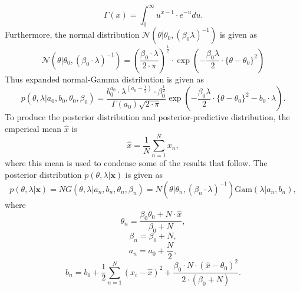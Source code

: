 \documentclass{article}
\begin{document}
\begin{equation}
\Gamma(x) = \int_{0}^{\infty} u^{x - 1} \cdot e^{-u} du.
\end{equation}
Furthermore, the normal distribution $\mathcal{N}\left( \theta \vert \theta_0, (\beta_0 \lambda)^{-1} \right)$ is given as
\begin{equation}
\mathcal{N}\left( \theta \vert \theta_0, (\beta_0 \cdot \lambda)^{-1} \right) = \left(\frac{\beta_0 \cdot \lambda}{2\cdot \pi}\right)^{\frac{1}{2}} \cdot \exp \left(  -\frac{\beta_0 \lambda}{2} \cdot \{ \theta - \theta_0 \}^2\right)
\end{equation}
Thus expanded normal-Gamma distribution is given as
\begin{equation}
p(\theta, \lambda \vert a_0, b_0, \theta_0, \beta_0) = \frac{b_0^{a_0} \cdot \lambda^{\left(a_0 - \frac{1}{2} \right)} \cdot \beta_0^{\frac{1}{2}} }{\Gamma(a_0) \sqrt{2 \cdot \pi}} \exp \left( -\frac{\beta_0 \lambda}{2} \cdot \{ \theta - \theta_0 \}^2 - b_0 \cdot \lambda \right).
\end{equation}
To produce the posterior distribution and posterior-predictive distribution, the emperical mean $\hat{x}$ is
\begin{equation}
\hat{x} = \frac{1}{N} \sum_{n=1}^{N} x_n,
\end{equation}
where this mean is used to condense some of the results that follow. The posterior distribution $p(\theta, \lambda \vert \mathbf{x})$ is given as
\begin{equation}
p(\theta, \lambda \vert \mathbf{x}) = NG(\theta, \lambda \vert a_n, b_n, \theta_n, \beta_n) = N(\theta \vert \theta_n, \left( \beta_n \cdot \lambda \right)^{-1}) \text{Gam}\left( \lambda \vert a_n, b_n \right),
\end{equation}
where
\begin{equation}\label{eq:theta_update}
\theta_n = \frac{\beta_0 \theta_0 + N \cdot \hat{x}}{\beta_0 + N},
\end{equation}
\begin{equation}\label{eq:beta_update}
\beta_n = \beta_0 + N,
\end{equation}
\begin{equation}\label{eq:a_update}
a_n = a_0 + \frac{N}{2},
\end{equation}
\begin{equation}\label{eq:b_update}
b_n = b_0 + \frac{1}{2}\sum_{n=1}^{N}(x_i - \hat{x})^2 + \frac{\beta_0 \cdot N \cdot (\hat{x} - \theta_0)^2}{2 \cdot (\beta_0 + N)}.
\end{equation}
\end{document}
